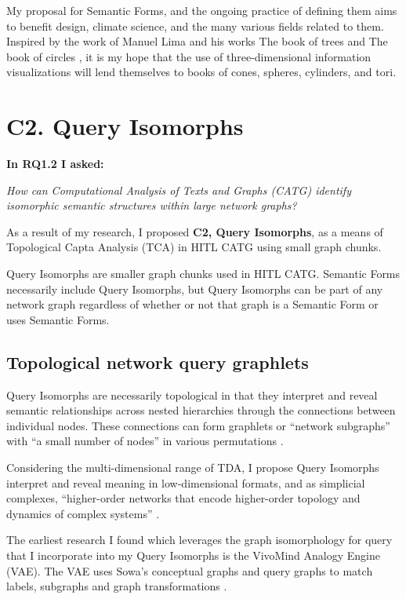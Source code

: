My proposal for Semantic Forms, and the ongoing practice of defining them aims to benefit design, climate science, and the many various fields related to them. Inspired by the work of Manuel Lima and his works The book of trees \citep{lima_book_2014} and The book of circles \citep{lima_book_2017}, it is my hope that the use of three-dimensional information visualizations will lend themselves to books of cones, spheres, cylinders, and tori.
\section{C2. Query Isomorphs}

\noindent\textbf{In RQ1.2 I asked:}

\textit{How can Computational Analysis of Texts and Graphs (CATG) identify isomorphic semantic structures within large network graphs?}

As a result of my research, I proposed \textbf{C2, Query Isomorphs}, as a means of Topological Capta Analysis (TCA) in HITL CATG using small graph chunks.

\vspace{1em}


Query Isomorphs are smaller graph chunks used in HITL CATG. Semantic Forms necessarily include Query Isomorphs, but Query Isomorphs can be part of any network graph regardless of whether or not that graph is a Semantic Form or uses Semantic Forms. 


\subsection{Topological network query graphlets}

Query Isomorphs are necessarily topological in that they interpret and reveal semantic relationships across nested hierarchies through the connections between individual nodes. These connections can form graphlets or “network subgraphs” with “a small number of nodes” 
\citep[p. 5-6]{przulj_modeling_2004} in various permutations \citep[p. 3]{sarajlic_graphlet-based_2016}. 

Considering the multi-dimensional range of TDA, I propose Query Isomorphs interpret and reveal meaning in low-dimensional formats, and as simplicial complexes, “higher-order networks that encode higher-order topology and dynamics of complex systems” \citep[p. 1]{wang_global_2024}. 

The earliest research I found which leverages the graph isomorphology for query that I incorporate into my Query Isomorphs is the VivoMind Analogy Engine (VAE). The VAE uses Sowa’s conceptual graphs and query graphs to match labels, subgraphs and graph transformations \citep[p. 22]{sowa_analogical_2003}. 

